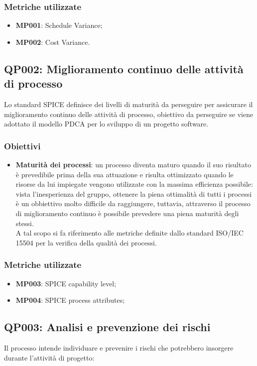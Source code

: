 \subsubsection{Metriche utilizzate}
\begin{itemize}
	\item \textbf{MP001}: Schedule Variance;
	\item \textbf{MP002}: Cost Variance.
\end{itemize}


\subsection{QP002: Miglioramento continuo delle attività di processo}
Lo standard SPICE definisce dei livelli di maturità da perseguire per assicurare il miglioramento continuo delle attività di processo, obiettivo da perseguire se viene adottato il modello PDCA per lo sviluppo di un progetto software.
\subsubsection{Obiettivi}
\begin{itemize}
	\item \textbf{Maturità dei processi}: un processo diventa maturo quando il suo risultato è prevedibile prima della sua attuazione e risulta ottimizzato quando le risorse da lui impiegate vengono utilizzate con la massima efficienza possibile: vista l'inesperienza del gruppo, ottenere la piena ottimalità di tutti i processi è un obbiettivo molto difficile da raggiungere, tuttavia, attraverso il processo di miglioramento continuo è possibile prevedere una piena maturità degli stessi.\\
	A tal scopo si fa riferimento alle metriche definite dallo standard ISO/IEC 15504 per la verifica della qualità dei processi.
\end{itemize}

\subsubsection{Metriche utilizzate}
\begin{itemize}
	\item \textbf{MP003}: SPICE capability level;
	\item \textbf{MP004}: SPICE process attributes;
\end{itemize}

\subsection{QP003: Analisi e prevenzione dei rischi}
Il processo intende individuare e prevenire i rischi che potrebbero insorgere durante l'attività di progetto:

